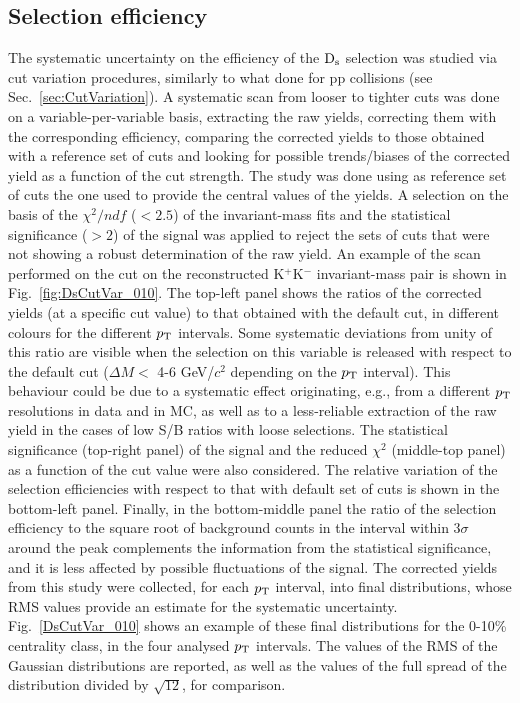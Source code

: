 \subsection{Selection efficiency}
\label{sec:CutVarsystAA}
The systematic uncertainty on the efficiency of the ${\rm D_s}$ selection was studied
via cut variation procedures, similarly to what done for pp collisions (see Sec.~\ref{sec:CutVariation}).
A systematic scan from looser to tighter cuts was done on a variable-per-variable 
basis, extracting the raw yields, correcting them with the corresponding efficiency, 
comparing the corrected yields to those obtained 
with a reference set of cuts and looking for possible trends/biases of 
the corrected yield as a function of the cut strength.
The study was done using as reference set of cuts the one used 
to provide the central values of the yields. A selection
on the basis of the $\chi^2/ndf$ ($<2.5$) of the invariant-mass fits and the statistical significance ($>2$)
of the signal was applied to reject the sets of cuts that were not showing a robust 
determination of the raw yield.  
An example of the scan performed on the cut on the
reconstructed K$^+$K$^-$ invariant-mass pair is shown in Fig.~\ref{fig:DsCutVar_010}.
The top-left panel shows the ratios of the corrected yields 
(at a specific cut value) to that obtained with the default
cut, in different colours for the different $p_{\rm T}$ intervals.
Some systematic deviations from unity of this ratio are visible when the selection
on this variable is released with respect to the default cut ($\Delta M < $ 4-6 GeV/$c^2$ depending
on the $p_{\rm T}$ interval). 
This behaviour could be due to a systematic effect originating, e.g., from a 
different $p_{\rm T}$ resolutions in data and in MC, as well as to a less-reliable extraction of 
the raw yield in the cases of low S/B ratios with loose selections.
The statistical significance (top-right panel) of the signal and
the reduced $\chi^2$ (middle-top panel) as a function of the cut value were also considered.
The relative variation of the selection
efficiencies with respect to that with default set of cuts is shown in the bottom-left panel.
Finally, in the bottom-middle panel the ratio of the selection efficiency to the square root of 
background counts in the interval within $3\sigma$ around the peak complements 
the information from the statistical significance,
and it is less affected by possible fluctuations of the signal.
The corrected yields from this study were collected, for each $p_{\rm T}$ interval,
into final distributions, whose RMS values provide an estimate for the systematic uncertainty.
Fig.~\ref{DsCutVar_010} shows an example of these final distributions 
for the 0-10\% centrality class, in the four analysed $p_{\rm T}$ intervals. 
The values of the RMS of the Gaussian distributions are reported, as well as
the values of the full spread of the distribution divided by $\sqrt{12}$,
for comparison. 


